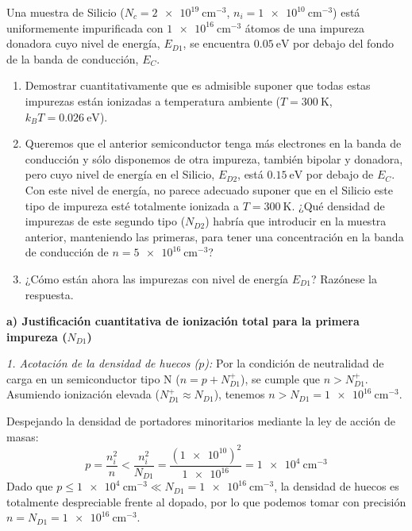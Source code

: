 \newpage
\begin{problema}
Una muestra de Silicio ($N_c = \SI{2e19}{\cm^{-3}}$, $n_i = \SI{1e10}{\cm^{-3}}$) está uniformemente impurificada con $\SI{1e16}{\cm^{-3}}$ átomos de una impureza donadora cuyo nivel de energía, $E_{D1}$, se encuentra $\SI{0.05}{\eV}$ por debajo del fondo de la banda de conducción, $E_C$.

\begin{enumerate}[label=\alph*)]
    \item Demostrar cuantitativamente que es admisible suponer que todas estas impurezas están ionizadas a temperatura ambiente ($T = \SI{300}{\kelvin}$, $k_B T = \SI{0.026}{\eV}$).
    \item Queremos que el anterior semiconductor tenga más electrones en la banda de conducción y sólo disponemos de otra impureza, también bipolar y donadora, pero cuyo nivel de energía en el Silicio, $E_{D2}$, está $\SI{0.15}{\eV}$ por debajo de $E_C$. Con este nivel de energía, no parece adecuado suponer que en el Silicio este tipo de impureza esté totalmente ionizada a $T = \SI{300}{\kelvin}$. ¿Qué densidad de impurezas de este segundo tipo ($N_{D2}$) habría que introducir en la muestra anterior, manteniendo las primeras, para tener una concentración en la banda de conducción de $n = \SI{5e16}{\cm^{-3}}$?
    \item ¿Cómo están ahora las impurezas con nivel de energía $E_{D1}$? Razónese la respuesta.
\end{enumerate}

\tcblower

\textbf{a) Justificación cuantitativa de ionización total para la primera impureza ($N_{D1}$)}

\textit{1. Acotación de la densidad de huecos ($p$):}
Por la condición de neutralidad de carga en un semiconductor tipo N ($n = p + N_{D1}^+$), se cumple que $n > N_{D1}^+$. Asumiendo ionización elevada ($N_{D1}^+ \approx N_{D1}$), tenemos $n > N_{D1} = \SI{1e16}{\cm^{-3}}$.

Despejando la densidad de portadores minoritarios mediante la ley de acción de masas:
\[
p = \frac{n_i^2}{n} < \frac{n_i^2}{N_{D1}} = \frac{(\num{1e10})^2}{\num{1e16}} = \SI{1e4}{\cm^{-3}}
\]
Dado que $p \le \SI{1e4}{\cm^{-3}} \ll N_{D1} = \SI{1e16}{\cm^{-3}}$, la densidad de huecos es totalmente despreciable frente al dopado, por lo que podemos tomar con precisión $n = N_{D1} = \SI{1e16}{\cm^{-3}}$.


\end{problema}
